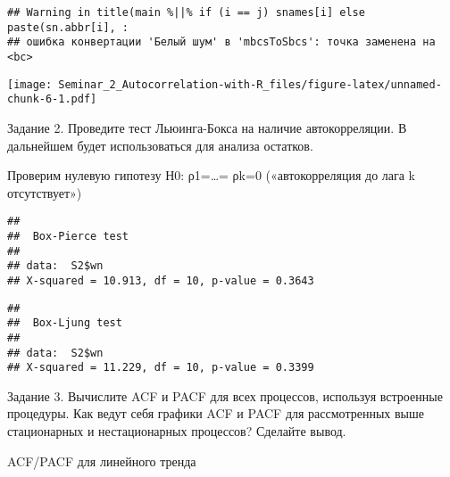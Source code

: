 \documentclass[
]{article}
\newenvironment{Shaded}{\begin{snugshade}}{\end{snugshade}}
\newcommand{\AttributeTok}[1]{\textcolor[rgb]{0.13,0.29,0.53}{#1}}
\newcommand{\CommentTok}[1]{\textcolor[rgb]{0.56,0.35,0.01}{\textit{#1}}}
\newcommand{\DecValTok}[1]{\textcolor[rgb]{0.00,0.00,0.81}{#1}}
\newcommand{\FunctionTok}[1]{\textcolor[rgb]{0.13,0.29,0.53}{\textbf{#1}}}
\newcommand{\NormalTok}[1]{#1}
\newcommand{\SpecialCharTok}[1]{\textcolor[rgb]{0.81,0.36,0.00}{\textbf{#1}}}
\newcommand{\StringTok}[1]{\textcolor[rgb]{0.31,0.60,0.02}{#1}}
\begin{document}
\begin{verbatim}
## Warning in title(main %||% if (i == j) snames[i] else paste(sn.abbr[i], :
## ошибка конвертации 'Белый шум' в 'mbcsToSbcs': точка заменена на <bc>
\end{verbatim}

\texttt{[image: Seminar\_2\_Autocorrelation-with-R\_files/figure-latex/unnamed-chunk-6-1.pdf]}

Задание 2. Проведите тест Льюинга-Бокса на наличие автокорреляции. В
дальнейшем будет использоваться для анализа остатков.

Проверим нулевую гипотезу Н0: ρ1=\ldots= ρk=0 («автокорреляция до лага k
отсутствует»)

\begin{Shaded}
\end{Shaded}

\begin{verbatim}
## 
##  Box-Pierce test
## 
## data:  S2$wn
## X-squared = 10.913, df = 10, p-value = 0.3643
\end{verbatim}

\begin{Shaded}
\end{Shaded}

\begin{verbatim}
## 
##  Box-Ljung test
## 
## data:  S2$wn
## X-squared = 11.229, df = 10, p-value = 0.3399
\end{verbatim}

Задание 3. Вычислите ACF и PACF для всех процессов, используя встроенные
процедуры. Как ведут себя графики ACF и PACF для рассмотренных выше
стационарных и нестационарных процессов? Сделайте вывод.

ACF/PACF для линейного тренда

\begin{Shaded}
\end{Shaded}
\end{document}
